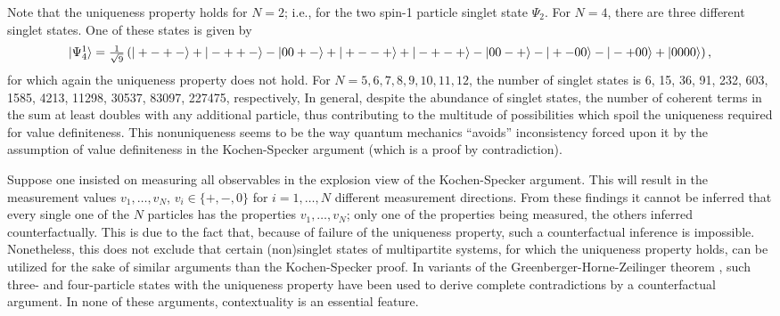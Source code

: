 \documentclass[prl,showpacs,showkeys,amsfonts]{revtex4}
\begin{document}
Note that the uniqueness property holds for $N=2$; i.e., for  the two spin-1 particle
singlet state $\Psi_2$.
For $N=4$, there are three different singlet states.
One of these states is given by
\begin{equation}
\begin{array}{l}
\vert \Psi_4^1 \rangle
= {1\over \sqrt{9}}\left(
\vert +-+- \rangle
+
\vert -++- \rangle
-
\vert 00+-\rangle
+
\vert +--+\rangle
+
\vert -+-+\rangle
-
\vert 00-+\rangle
-
\vert +-00\rangle
-
\vert -+00\rangle
+
\vert 0000\rangle
\right),
\label{2004-qnc-e12}
\end{array}
\end{equation}
for which again the uniqueness property does not hold.
For
$N=5,6,7,8,9,10,11,12$, the number of singlet states is
6, 15, 36, 91, 232, 603, 1585, 4213, 11298, 30537, 83097, 227475, respectively,
In general, despite the abundance of singlet states,
the number of coherent terms in the sum at least doubles
with any additional particle, thus contributing to the multitude of
possibilities which spoil the uniqueness required for value definiteness.
This nonuniqueness seems to be the way quantum mechanics ``avoids''
inconsistency forced upon it by the assumption  of value definiteness
in the Kochen-Specker argument (which is a proof by contradiction).




Suppose one insisted on measuring all observables in the explosion view of the Kochen-Specker argument.
This will result in the measurement values
$v_1,\ldots , v_N$, $v_i\in \{+,-,0\}$ for $i=1, \ldots ,N$ different measurement directions.
From these findings it cannot be inferred that every single one of the $N$ particles
has the properties $v_1,\ldots , v_N$; only one of the properties being measured, the others
inferred counterfactually. This is due to the fact that,
because of failure of the uniqueness property, such a counterfactual inference is impossible.
Nonetheless, this does not exclude that certain (non)singlet states of multipartite systems,
for which the uniqueness property holds,
can be utilized for the sake of similar arguments than the Kochen-Specker proof.
In variants of the Greenberger-Horne-Zeilinger theorem
\cite{ghz,ghsz,mermin90b}, such three- and four-particle
states with the uniqueness property have been used to derive
complete contradictions by a counterfactual argument.
In none of these arguments, contextuality is an essential feature.
\end{document}
